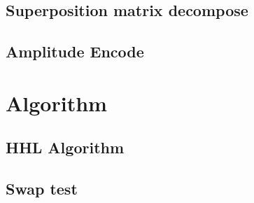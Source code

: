 \documentclass[a4paper,twoside,openany,CJK]{ctexbook}
\begin{document}


\section{\label{sec:SuperpositionDecompose}Superposition matrix decompose}

\section{\label{sec:AmplitudeEncode}Amplitude Encode}



\chapter{\label{sec:Algorithm}Algorithm}

\section{\label{sec:hhl}HHL Algorithm}



\section{\label{sec:swap}Swap test}



\clearpage

\printindex



\end{document}
